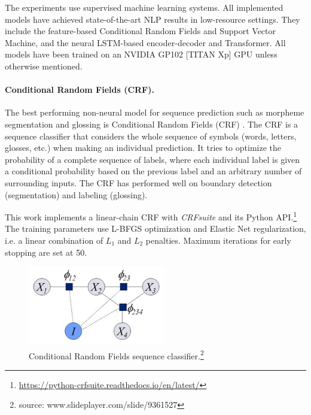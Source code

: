 The experiments use supervised machine learning systems. All implemented models have achieved state-of-the-art NLP results in low-resource settings. They include the feature-based Conditional Random Fields and Support Vector Machine, and the neural LSTM-based encoder-decoder and Transformer. All models have been trained on an NVIDIA GP102 [TITAN Xp] GPU unless otherwise mentioned.

\paragraph{Conditional Random Fields (CRF).} The best performing non-neural model for sequence prediction such as morpheme segmentation and glossing is Conditional Random Fields (CRF) \citep{lafferty_conditional_2001,muller_efficient_2013,ruokolainen_comparative_2016}. The CRF is a sequence classifier that considers the whole sequence of symbols (words, letters, glosses, etc.) when making an individual prediction. It tries to optimize the probability of a complete sequence of labels, where each individual label is given a conditional probability based on the previous label and an arbitrary number of surrounding inputs. %
The CRF has performed well on boundary detection (segmentation) and labeling (glossing). 

This work implements a linear-chain CRF \citep{lafferty_conditional_2001} with \textit{CRFsuite} \citep{okazaki2007} and its Python API.\footnote{\url{https://python-crfsuite.readthedocs.io/en/latest/}} The training parameters use L-BFGS optimization \citep{liu1989} and Elastic Net regularization, i.e. a linear combination of $L_1$ and $L_2$ penalties. Maximum iterations for early stopping are set at 50.


\begin{figure}
    \centering
    \includegraphics[width=6cm]{figs/CRF.jpg}
    \caption[Conditional Random Fields]{Conditional Random Fields sequence classifier.\footnote{source: www.slideplayer.com/slide/9361527}}
    \label{fig:CRF}
\end{figure}


